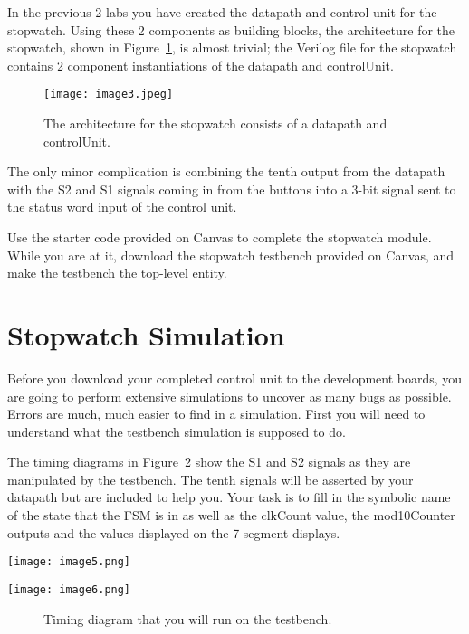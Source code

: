 In the previous 2 labs you have created the datapath and control unit
for the stopwatch. Using these 2 components as building blocks, the
architecture for the stopwatch, shown in Figure~\ref{fig:swArch}, is almost trivial;
the Verilog file for the stopwatch contains 2 component instantiations
of the datapath and controlUnit.

\begin{figure}
\texttt{[image: image3.jpeg]}
\caption{The architecture for the stopwatch consists of a datapath and
controlUnit.}
\label{fig:swArch}
\end{figure}

The only minor complication is combining the tenth output from the
datapath with the S2 and S1 signals coming in from the
buttons into a 3-bit signal sent to the status word input of the control
unit.

Use the starter code provided on Canvas to complete the stopwatch
module. While you are at it, download the stopwatch testbench provided
on Canvas, and make the testbench the top-level entity.

\section{Stopwatch Simulation}

Before you download your completed control unit to the development boards,
you are going to perform extensive simulations to uncover as many bugs
as possible. Errors are much, much easier to find in a simulation. First
you will need to understand what the testbench simulation is supposed to
do.

The timing diagrams in Figure~\ref{fig:swTiming} show the S1 and S2 signals
as they are manipulated by the testbench. The tenth signals will be
asserted by your datapath but are included to help you. Your task is to
fill in the symbolic name of the state that the FSM is in as well as the
clkCount value, the mod10Counter outputs and the values displayed on the
7-segment displays.

\begin{landscape}

\texttt{[image: image5.png]}

\texttt{[image: image6.png]}
\begin{figure}
\caption{Timing diagram that you will run on the testbench.}
\label{fig:swTiming}
\end{figure}
\end{landscape}

